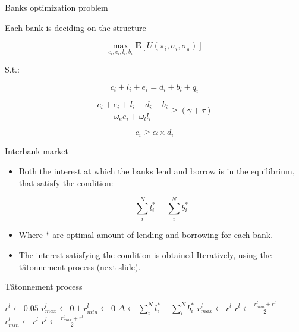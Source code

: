 \documentclass{beamer}
\begin{document}
\begin{frame}{Banks optimization problem}

    Each bank is deciding on the structure 

    \[\max_{c_i, e_i, l_i, b_i} \mathbf{E}[U(\pi_i, \sigma_i, \sigma_\pi)]\]

    S.t.:

    \[c_i + l_i + e_i = d_i + b_i + q_i\]

    \[\frac{c_i + e_i + l_i - d_i - b_i}{\omega_e e_i + \omega_l l_i} \geq (\gamma + \tau)\]
    
    \[c_i \geq \alpha \times d_i\]
        
\end{frame}

\begin{frame}{Interbank market}
    
    \begin{itemize}
        \item Both the interest at which the banks lend and borrow is in the equilibrium, that satisfy the condition:
        
        \[\sum_{i}^{N} l_i^* = \sum_{i}^{N} b_i^*\]
        
        \item Where $*$ are optimal amount of lending and borrowing for each bank.
        
        \item The interest satisfying the condition is obtained Iteratively, using the tâtonnement process (next slide). 
    \end{itemize}

\end{frame}

\begin{frame}{Tâtonnement process}
    
    \begin{algorithm}[H]
        \caption{tatonnement process}\label{alg:cap}
        \begin{algorithmic}
        \State $r^l \gets 0.05$
        \State $r^l_{max} \gets 0.1$
        \State $r^l_{min} \gets 0$
        \State $\Delta \gets \sum_{i}^{N} l_i^* - \sum_{i}^{N} b_i^*$
            \State $r^l_{max} \gets r^l$
            \State $r^l \gets \frac{r^l_{min} + r^l}{2}$
            \State $r^l_{min} \gets r^l$
            \State $r^l \gets \frac{r^l_{max} + r^l}{2}$
        \EndIf
        \EndWhile
        \end{algorithmic}
    \end{algorithm}

\end{frame}
\end{document}
